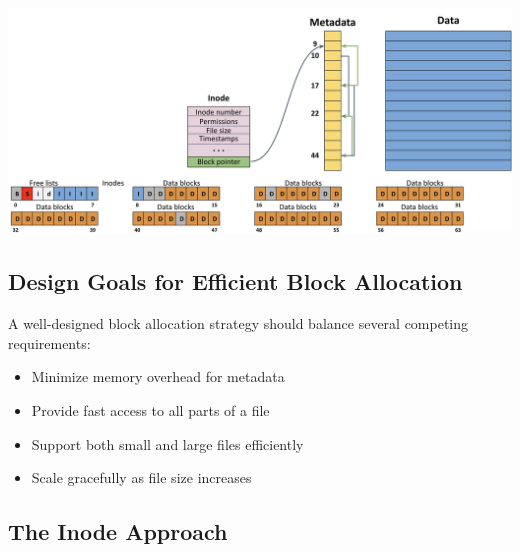 \documentclass[../../compsys.tex]{subfiles}
\begin{document}
\begin{center}
  \includegraphics[width=1.05\textwidth]{chapters/L7/images/problem.png}
\end{center}
\newpage
\subsection{Design Goals for Efficient Block Allocation}

A well-designed block allocation strategy should balance several competing requirements:
\begin{itemize}
  \item Minimize memory overhead for metadata
  \item Provide fast access to all parts of a file
  \item Support both small and large files efficiently
  \item Scale gracefully as file size increases
\end{itemize}

\subsection{The Inode Approach}
\end{document}
